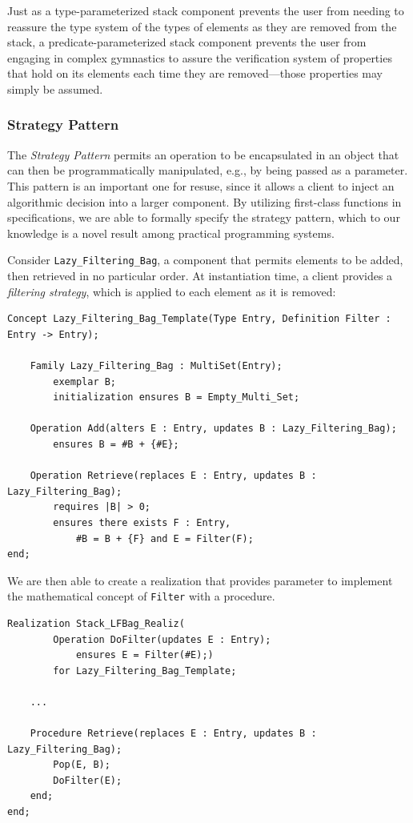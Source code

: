 Just as a type-parameterized stack component prevents the user from needing to reassure the type system of the types of elements as they are removed from the stack, a predicate-parameterized stack component prevents the user from engaging in complex gymnastics to assure the verification system of properties that hold on its elements each time they are removed---those properties may simply be assumed. 

		\subsubsection{Strategy Pattern\label{strategyPattern}}

The \emph{Strategy Pattern} permits an operation to be encapsulated in an object that can then be programmatically manipulated, e.g., by being passed as a parameter.  This pattern is an important one for resuse, since it allows a client to inject an algorithmic decision into a larger component.  By utilizing first-class functions in specifications, we are able to formally specify the strategy pattern, which to our knowledge is a novel result among practical programming systems.

Consider \texttt{Lazy\_Filtering\_Bag}, a component that permits elements to be added, then retrieved in no particular order.   At instantiation time, a client provides a \emph{filtering strategy}, which is applied to each element as it is removed:

\begin{lstlisting}
Concept Lazy_Filtering_Bag_Template(Type Entry, Definition Filter : Entry -> Entry);
	
	Family Lazy_Filtering_Bag : MultiSet(Entry);
		exemplar B;
		initialization ensures B = Empty_Multi_Set;

	Operation Add(alters E : Entry, updates B : Lazy_Filtering_Bag);
		ensures B = #B + {#E};

	Operation Retrieve(replaces E : Entry, updates B : Lazy_Filtering_Bag);
		requires |B| > 0;
		ensures there exists F : Entry,
			#B = B + {F} and E = Filter(F);
end;
\end{lstlisting}

We are then able to create a realization that provides parameter to implement the mathematical concept of \texttt{Filter} with a procedure.

\begin{lstlisting}
Realization Stack_LFBag_Realiz(
		Operation DoFilter(updates E : Entry);
			ensures E = Filter(#E);)
		for Lazy_Filtering_Bag_Template;

	...

	Procedure Retrieve(replaces E : Entry, updates B : Lazy_Filtering_Bag);
		Pop(E, B);
		DoFilter(E);
	end;
end;
\end{lstlisting}

